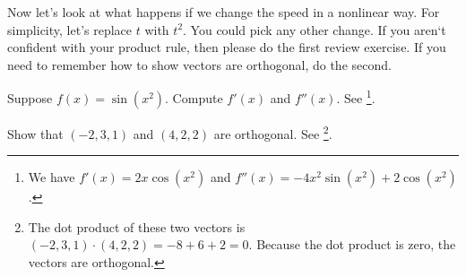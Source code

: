 Now let's look at what happens if we change the speed in a nonlinear way.  For simplicity, let's replace $t$ with $t^2$.  You could pick any other change. If you aren`t confident with your product rule, then please do the first review exercise. If you need to remember how to show vectors are orthogonal, do the second.

\begin{review*}
 Suppose $f(x) = \sin(x^2)$.  Compute $f'(x)$ and $f''(x)$.  See 
\footnote{
We have $f'(x) = 2x\cos(x^2)$ and $f''(x) = -4x^2\sin(x^2)+2\cos(x^2)$.
}.
\end{review*}
\begin{review*}
 Show that $(-2,3,1)$ and $(4,2,2)$ are orthogonal. See 
\footnote{The dot product of these two vectors is 
$(-2,3,1)\cdot(4,2,2) = -8+6+2=0$. Because the dot product is zero, the vectors are orthogonal.
}.
\end{review*}



